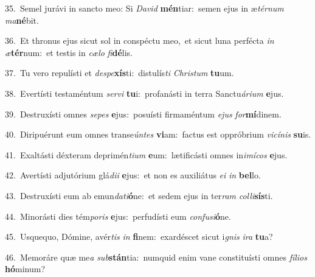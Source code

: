 {\numbfont\textcolor{\numbcolor}{35.}}~Semel jurávi in sancto meo: Si \textit{Da}\-\textit{vid} \textbf{mén}\-tiar:~\star semen ejus in æ\-\textit{tér}\-\textit{num} \textit{ma}\-\textbf{né}bit.\par
{\numbfont\textcolor{\numbcolor}{36.}}~Et thronus ejus sicut sol in conspéctu meo,~\dagger et sicut luna perfécta \textit{in} \textit{æ}\-\textbf{tér}num:~\star et testis in \textit{cæ}\-\textit{lo} \textit{fi}\-\textbf{dé}lis.\par
{\numbfont\textcolor{\numbcolor}{37.}}~Tu vero repulísti et \textit{de}\-\textit{spe}\textbf{xís}ti:~\star distulís\textit{ti} \textit{Chris}\-\textit{tum} \textbf{tu}\-um.\par
{\numbfont\textcolor{\numbcolor}{38.}}~Evertísti testaméntum \textit{ser}\-\textit{vi} \textbf{tu}\-i:~\star profanásti in terra Sanctu\-\textit{á}\-\textit{ri}\textit{um} \textbf{e}\-jus.\par
{\numbfont\textcolor{\numbcolor}{39.}}~Destruxísti omnes \textit{se}\-\textit{pes} \textbf{e}\-jus:~\star posuísti firmaméntum \textit{e}\-\textit{jus} \textit{for}\-\textbf{mí}dinem.\par
{\numbfont\textcolor{\numbcolor}{40.}}~Diripuérunt eum omnes transe\-\textit{ún}\-\textit{tes} \textbf{vi}\-am:~\star factus est oppróbrium \textit{vi}\-\textit{cí}\textit{nis} \textbf{su}\-is.\par
{\numbfont\textcolor{\numbcolor}{41.}}~Exaltásti déxteram deprimén\-\textit{ti}\-\textit{um} \textbf{e}\-um:~\star lætificásti omnes in\-\textit{i}\-\textit{mí}\textit{cos} \textbf{e}\-jus.\par
{\numbfont\textcolor{\numbcolor}{42.}}~Avertísti adjutórium glá\-\textit{di}\-\textit{i} \textbf{e}\-jus:~\star et non es auxiliátus \textit{e}\-\textit{i} \textit{in} \textbf{bel}\-lo.\par
{\numbfont\textcolor{\numbcolor}{43.}}~Destruxísti eum ab emun\-\textit{da}\-\textit{ti}\textbf{ó}ne:~\star et sedem ejus in ter\textit{ram} \textit{col}\-\textit{li}\textbf{sís}ti.\par
{\numbfont\textcolor{\numbcolor}{44.}}~Minorásti dies tém\-\textit{po}\-\textit{ris} \textbf{e}\-jus:~\star perfudísti eum \textit{con}\-\textit{fu}\textit{si}\textbf{ó}ne.\par
{\numbfont\textcolor{\numbcolor}{45.}}~Usquequo, Dómine, avér\textit{tis} \textit{in} \textbf{fi}\-nem:~\star exardéscet sicut i\textit{gnis} \textit{i}\-\textit{ra} \textbf{tu}\-a?\par
{\numbfont\textcolor{\numbcolor}{46.}}~Memoráre quæ me\textit{a} \textit{sub}\-\textbf{stán}tia:~\star numquid enim vane constituísti omnes \textit{fí}\-\textit{li}\textit{os} \textbf{hó}\-minum?\par

